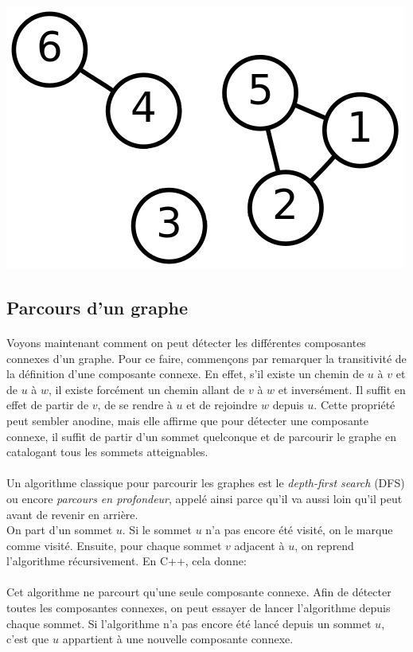\begin{center}
\includegraphics[width=0.5\linewidth]{images/3-components.png}
\end{center}

\subsection{Parcours d'un graphe}
\paragraph{}
Voyons maintenant comment on peut détecter les différentes composantes connexes d'un graphe. Pour ce faire, commençons par remarquer la transitivité de la définition d'une composante connexe. En effet, s'il existe un chemin de $u$ à $v$ et de $u$ à $w$, il existe forcément un chemin allant de $v$ à $w$ et inversément. Il suffit en effet de partir de $v$, de se rendre à $u$ et de rejoindre $w$ depuis $u$. Cette propriété peut sembler anodine, mais elle affirme que pour détecter une composante connexe, il suffit de partir d'un sommet quelconque et de parcourir le graphe en catalogant tous les sommets atteignables.

\paragraph{}
Un algorithme classique pour parcourir les graphes est le \textit{depth-first search} (DFS) ou encore \textit{parcours en profondeur}, appelé ainsi parce qu'il va aussi loin qu'il peut avant de revenir en arrière. \\
On part d'un sommet $u$. Si le sommet $u$ n'a pas encore été visité, on le marque comme visité. Ensuite, pour chaque sommet $v$ adjacent à $u$, on reprend l'algorithme récursivement. En C++, cela donne:



\paragraph{}
Cet algorithme ne parcourt qu'une seule composante connexe. Afin de détecter toutes les composantes connexes, on peut essayer de lancer l'algorithme depuis chaque sommet. Si l'algorithme n'a pas encore été lancé depuis un sommet $u$, c'est que $u$ appartient à une nouvelle composante connexe.

